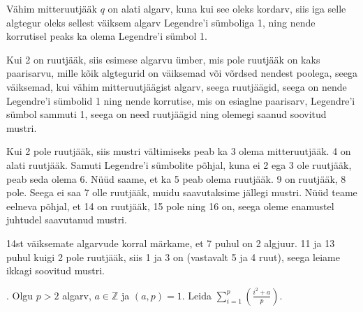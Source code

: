 \documentclass[a4paper, 10pt]{article}
\newcommand{\Z}{\mathbb{Z}}
\begin{document}
\bigskip
Vähim mitteruutjääk $q$ on alati algarv, kuna kui see oleks kordarv, siis iga selle algtegur oleks sellest väiksem algarv Legendre'i sümboliga 1, ning nende korrutisel peaks ka olema Legendre'i sümbol 1. 

Kui 2 on ruutjääk, siis esimese algarvu ümber, mis pole ruutjääk on kaks paarisarvu, mille kõik algtegurid on väiksemad või võrdsed nendest poolega, seega väiksemad, kui vähim mitteruutjäägist algarv, seega ruutjäägid, seega on nende Legendre'i sümbolid 1 ning nende korrutise, mis on esiaglne paarisarv, Legendre'i sümbol sammuti 1, seega on need ruutjäägid ning olemegi saanud soovitud mustri. 

Kui 2 pole ruutjääk, siis mustri vältimiseks peab ka 3 olema mitteruutjääk. 4 on alati ruutjääk. Samuti Legendre'i sümbolite põhjal, kuna ei 2 ega 3 ole ruutjääk, peab seda olema 6. Nüüd saame, et ka 5 peab olema ruutjääk. 9 on ruutjääk, 8 pole. Seega ei saa 7 olle ruutjääk, muidu saavutaksime jällegi mustri. Nüüd teame eelneva põhjal, et 14 on ruutjääk, 15 pole ning 16 on, seega oleme enamustel juhtudel saavutanud mustri. 

14st väiksemate algarvude korral märkame, et 7 puhul on 2 algjuur. 11 ja 13 puhul kuigi 2 pole ruutjääk, siis 1 ja 3 on (vastavalt 5 ja 4 ruut), seega leiame ikkagi soovitud mustri.
\bigskip


\pagebreak

. Olgu $p>2$ algarv, $a\in\Z$ ja $(a,p) = 1$. Leida $\sum\limits_{i=1}^{p}\left(\frac{i^2+a}{p}\right).$
\end{document}

